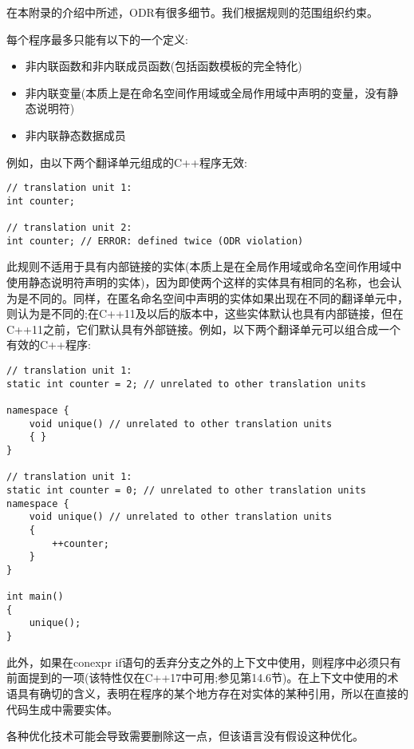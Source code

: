 
在本附录的介绍中所述，ODR有很多细节。我们根据规则的范围组织约束。


每个程序最多只能有以下的一个定义:

\begin{itemize}
\item 
非内联函数和非内联成员函数(包括函数模板的完全特化)

\item 
非内联变量(本质上是在命名空间作用域或全局作用域中声明的变量，没有静态说明符)

\item 
非内联静态数据成员
\end{itemize}

例如，由以下两个翻译单元组成的C++程序无效:

\begin{lstlisting}[style=styleCXX]
// translation unit 1:
int counter;

// translation unit 2:
int counter; // ERROR: defined twice (ODR violation)
\end{lstlisting}

此规则不适用于具有内部链接的实体(本质上是在全局作用域或命名空间作用域中使用静态说明符声明的实体)，因为即使两个这样的实体具有相同的名称，也会认为是不同的。同样，在匿名命名空间中声明的实体如果出现在不同的翻译单元中，则认为是不同的;在C++11及以后的版本中，这些实体默认也具有内部链接，但在C++11之前，它们默认具有外部链接。例如，以下两个翻译单元可以组合成一个有效的C++程序:

\begin{lstlisting}[style=styleCXX]
// translation unit 1:
static int counter = 2; // unrelated to other translation units

namespace {
	void unique() // unrelated to other translation units
	{ }
}

// translation unit 1:
static int counter = 0; // unrelated to other translation units
namespace {
	void unique() // unrelated to other translation units
	{
		++counter;
	}
}

int main()
{
	unique();
}
\end{lstlisting}

此外，如果在conexpr if语句的丢弃分支之外的上下文中使用，则程序中必须只有前面提到的一项(该特性仅在C++17中可用;参见第14.6节)。在上下文中使用的术语具有确切的含义，表明在程序的某个地方存在对实体的某种引用，所以在直接的代码生成中需要实体。

\begin{tcolorbox}[colback=webgreen!5!white,colframe=webgreen!75!black]
\hspace*{0.75cm}各种优化技术可能会导致需要删除这一点，但该语言没有假设这种优化。
\end{tcolorbox}

